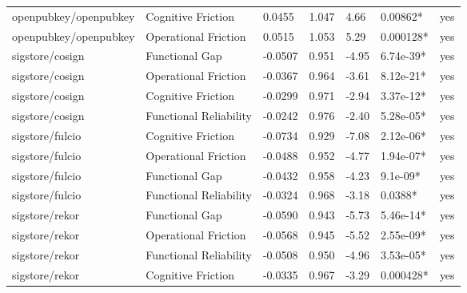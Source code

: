 \begin{table}[t]
\begin{tabular}{lllllll}
openpubkey/openpubkey & Cognitive Friction & 0.0455 & 1.047 & 4.66 & 0.00862* & yes \\
openpubkey/openpubkey & Operational Friction & 0.0515 & 1.053 & 5.29 & 0.000128* & yes \\
sigstore/cosign & Functional Gap & -0.0507 & 0.951 & -4.95 & 6.74e-39* & yes \\
sigstore/cosign & Operational Friction & -0.0367 & 0.964 & -3.61 & 8.12e-21* & yes \\
sigstore/cosign & Cognitive Friction & -0.0299 & 0.971 & -2.94 & 3.37e-12* & yes \\
sigstore/cosign & Functional Reliability & -0.0242 & 0.976 & -2.40 & 5.28e-05* & yes \\
sigstore/fulcio & Cognitive Friction & -0.0734 & 0.929 & -7.08 & 2.12e-06* & yes \\
sigstore/fulcio & Operational Friction & -0.0488 & 0.952 & -4.77 & 1.94e-07* & yes \\
sigstore/fulcio & Functional Gap & -0.0432 & 0.958 & -4.23 & 9.1e-09* & yes \\
sigstore/fulcio & Functional Reliability & -0.0324 & 0.968 & -3.18 & 0.0388* & yes \\
sigstore/rekor & Functional Gap & -0.0590 & 0.943 & -5.73 & 5.46e-14* & yes \\
sigstore/rekor & Operational Friction & -0.0568 & 0.945 & -5.52 & 2.55e-09* & yes \\
sigstore/rekor & Functional Reliability & -0.0508 & 0.950 & -4.96 & 3.53e-05* & yes \\
sigstore/rekor & Cognitive Friction & -0.0335 & 0.967 & -3.29 & 0.000428* & yes \\
\hline
\end{tabular}
\end{table}
